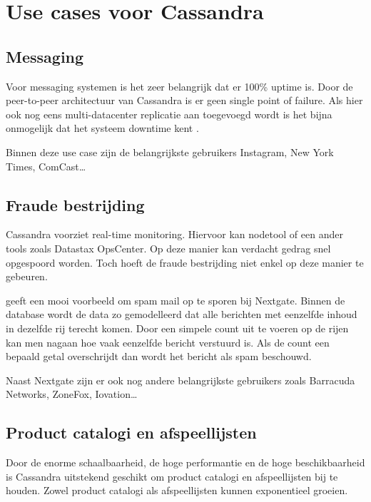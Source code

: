 \chapter{Use cases voor Cassandra}
\label{ch:cassandra_ucs}

\section{Messaging}
Voor messaging systemen is het zeer belangrijk dat er 100\% uptime is.
Door de peer-to-peer architectuur van Cassandra is er geen single point of failure.
Als hier ook nog eens multi-datacenter replicatie aan toegevoegd wordt is het bijna onmogelijk dat het systeem downtime kent \citep{Chan2014Messaging}.

Binnen deze use case zijn de belangrijkste gebruikers Instagram, New York Times, ComCast\dots

\section{Fraude bestrijding}
Cassandra voorziet real-time monitoring.
Hiervoor kan nodetool of een ander tools zoals Datastax OpsCenter.
Op deze manier kan verdacht gedrag snel opgespoord worden.
Toch hoeft de fraude bestrijding niet enkel op deze manier te gebeuren.

\cite{Nguyen2014Fraud} geeft een mooi voorbeeld om spam mail op te sporen bij Nextgate.
Binnen de database wordt de data zo gemodelleerd dat alle berichten met eenzelfde inhoud in dezelfde rij terecht komen.
Door een simpele count uit te voeren op de rijen kan men nagaan hoe vaak eenzelfde bericht verstuurd is.
Als de count een bepaald getal overschrijdt dan wordt het bericht als spam beschouwd.

Naast Nextgate zijn er ook nog andere belangrijkste gebruikers zoals Barracuda Networks, ZoneFox, Iovation\dots

\section{Product catalogi en afspeellijsten}
Door de enorme schaalbaarheid, de hoge performantie en de hoge beschikbaarheid is Cassandra uitstekend geschikt om product catalogi en afspeellijsten bij te houden.
Zowel product catalogi als afspeellijsten kunnen exponentieel groeien.

